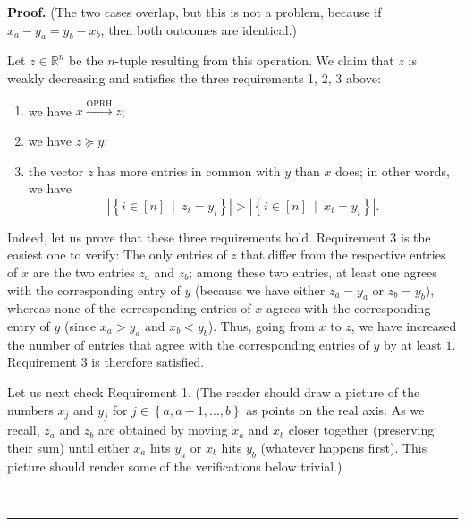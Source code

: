 \documentclass[numbers=enddot,12pt,final,onecolumn,notitlepage]{scrartcl}%
\numberwithin{exer}{subsection}
\theoremstyle{definition}
\newenvironment{proof}[1][Proof]{\noindent\textbf{#1.} }{\ \rule{0.5em}{0.5em}}
\begin{document}
\begin{proof}
\noindent(The two cases overlap, but this is not a problem, because if
$x_{a}-y_{a}=y_{b}-x_{b}$, then both outcomes are identical.)

Let $z\in\mathbb{R}^{n}$ be the $n$-tuple resulting from this operation. We
claim that $z$ is weakly decreasing and satisfies the three requirements 1, 2,
3 above:

\begin{enumerate}
\item we have $x\overset{\text{OPRH}}{\longrightarrow}z$;

\item we have $z\succcurlyeq y$;

\item the vector $z$ has more entries in common with $y$ than $x$ does; in
other words, we have%
\[
\left\vert \left\{  i\in\left[  n\right]  \ \mid\ z_{i}=y_{i}\right\}
\right\vert >\left\vert \left\{  i\in\left[  n\right]  \ \mid\ x_{i}%
=y_{i}\right\}  \right\vert .
\]

\end{enumerate}

Indeed, let us prove that these three requirements hold. Requirement 3 is the
easiest one to verify: The only entries of $z$ that differ from the respective
entries of $x$ are the two entries $z_{a}$ and $z_{b}$; among these two
entries, at least one agrees with the corresponding entry of $y$ (because we
have either $z_{a}=y_{a}$ or $z_{b}=y_{b}$), whereas none of the corresponding
entries of $x$ agrees with the corresponding entry of $y$ (since $x_{a}>y_{a}$
and $x_{b}<y_{b}$). Thus, going from $x$ to $z$, we have increased the number
of entries that agree with the corresponding entries of $y$ by at least $1$.
Requirement 3 is therefore satisfied.

Let us next check Requirement 1. (The reader should draw a picture of the
numbers $x_{j}$ and $y_{j}$ for $j\in\left\{  a,a+1,\ldots,b\right\}  $ as
points on the real axis. As we recall, $z_{a}$ and $z_{b}$ are obtained by
moving $x_{a}$ and $x_{b}$ closer together (preserving their sum) until either
$x_{a}$ hits $y_{a}$ or $x_{b}$ hits $y_{b}$ (whatever happens first). This
picture should render some of the verifications below trivial.)


\end{proof}
\end{document}

